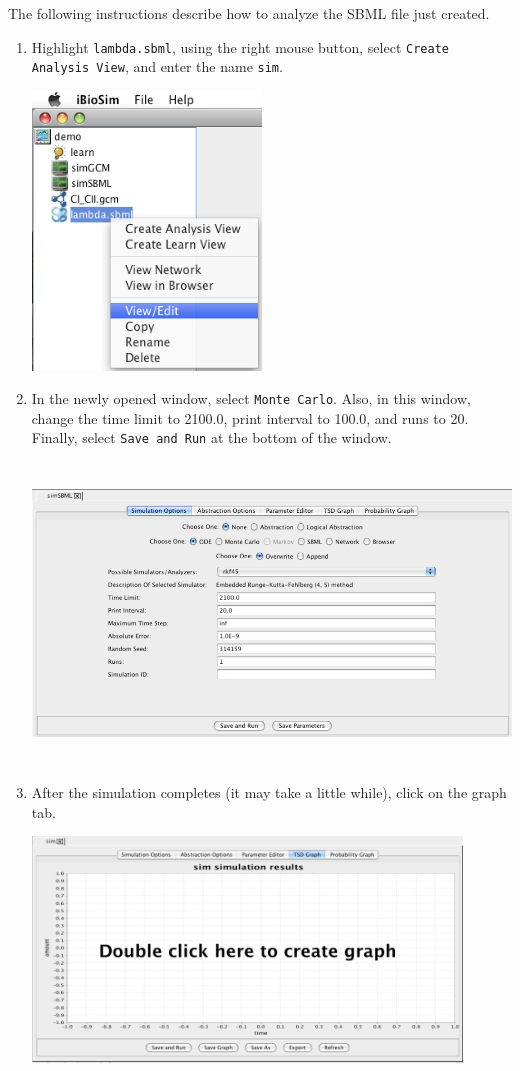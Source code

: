 \documentclass[titlepage,11pt]{article}
\begin{document}
The following instructions describe how to analyze the SBML file just 
created.
\begin{enumerate}
\item Highlight {\tt lambda.sbml}, using the right mouse button, select 
      {\tt Create Analysis View}, and enter the name {\tt sim}.

\includegraphics[height=74mm]{screenshots/modSBML}

\item In the newly opened window, select {\tt Monte Carlo}.
      Also, in this window, change the time limit to 2100.0, print interval
      to 100.0, and runs to 20.
      Finally, select {\tt Save and Run} at the bottom of the window.

\includegraphics[height=80mm]{screenshots/analysisView}

\item After the simulation completes (it may take a little while), click on
      the graph tab.

\includegraphics[height=60mm]{screenshots/emptyGraph}


\end{enumerate}
\end{document}
